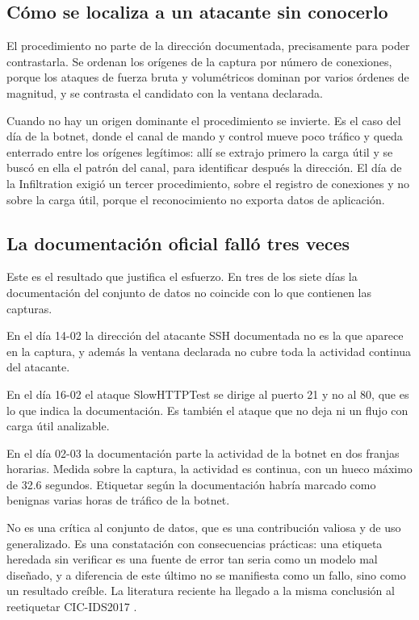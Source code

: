 \subsection*{Cómo se localiza a un atacante sin conocerlo}

El procedimiento no parte de la dirección documentada, precisamente para poder
contrastarla. Se ordenan los orígenes de la captura por número de conexiones,
porque los ataques de fuerza bruta y volumétricos dominan por varios órdenes de
magnitud, y se contrasta el candidato con la ventana declarada.

Cuando no hay un origen dominante el procedimiento se invierte. Es el caso del
día de la botnet, donde el canal de mando y control mueve poco tráfico y queda
enterrado entre los orígenes legítimos: allí se extrajo primero la carga útil y
se buscó en ella el patrón del canal, para identificar después la dirección. El
día de la Infiltration exigió un tercer procedimiento, sobre el registro de
conexiones y no sobre la carga útil, porque el reconocimiento no exporta datos de
aplicación.

\subsection*{La documentación oficial falló tres veces}

Este es el resultado que justifica el esfuerzo. En tres de los siete días la
documentación del conjunto de datos no coincide con lo que contienen las
capturas.

En el día 14-02 la dirección del atacante SSH documentada no es la que aparece
en la captura, y además la ventana declarada no cubre toda la actividad continua
del atacante.

En el día 16-02 el ataque SlowHTTPTest se dirige al puerto 21 y no al 80, que es
lo que indica la documentación. Es también el ataque que no deja ni un flujo con
carga útil analizable.

En el día 02-03 la documentación parte la actividad de la botnet en dos franjas
horarias. Medida sobre la captura, la actividad es continua, con un hueco máximo
de 32.6 segundos. Etiquetar según la documentación habría marcado como benignas
varias horas de tráfico de la botnet.

No es una crítica al conjunto de datos, que es una contribución valiosa y de uso
generalizado. Es una constatación con consecuencias prácticas: una etiqueta
heredada sin verificar es una fuente de error tan seria como un modelo mal
diseñado, y a diferencia de este último no se manifiesta como un fallo, sino como
un resultado creíble. La literatura reciente ha llegado a la misma conclusión al
reetiquetar CIC-IDS2017 \cite{Engelen2021}.

